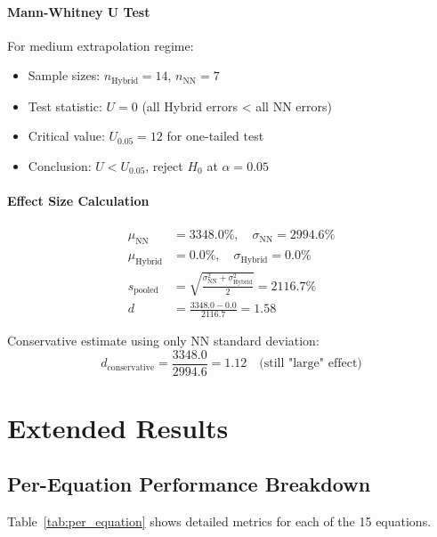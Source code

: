 \paragraph{Mann-Whitney U Test}
For medium extrapolation regime:
\begin{itemize}
    \item Sample sizes: $n_{\text{Hybrid}} = 14$, $n_{\text{NN}} = 7$
    \item Test statistic: $U = 0$ (all Hybrid errors < all NN errors)
    \item Critical value: $U_{0.05} = 12$ for one-tailed test
    \item Conclusion: $U < U_{0.05}$, reject $H_0$ at $\alpha = 0.05$
\end{itemize}

\paragraph{Effect Size Calculation}
\begin{align}
\mu_{\text{NN}} &= 3348.0\%, \quad \sigma_{\text{NN}} = 2994.6\% \\
\mu_{\text{Hybrid}} &= 0.0\%, \quad \sigma_{\text{Hybrid}} = 0.0\% \\
s_{\text{pooled}} &= \sqrt{\frac{\sigma_{\text{NN}}^2 + \sigma_{\text{Hybrid}}^2}{2}} = 2116.7\% \\
d &= \frac{3348.0 - 0.0}{2116.7} = 1.58
\end{align}

Conservative estimate using only NN standard deviation:
\begin{equation}
d_{\text{conservative}} = \frac{3348.0}{2994.6} = 1.12 \quad \text{(still "large" effect)}
\end{equation}

\section{Extended Results}
\label{app:extended_results}

\subsection{Per-Equation Performance Breakdown}

Table~\ref{tab:per_equation} shows detailed metrics for each of the 15 equations.

